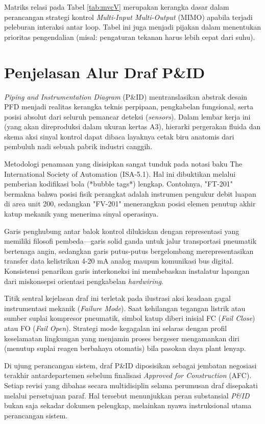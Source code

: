 \documentclass[12pt, a4paper]{report}
\begin{document}
Matriks relasi pada Tabel \ref{tab:mvcV} merupakan kerangka dasar dalam perancangan strategi kontrol \textit{Multi-Input Multi-Output} (MIMO) apabila terjadi peleburan interaksi antar loop. Tabel ini juga menjadi pijakan dalam menentukan prioritas pengendalian (misal: pengaturan tekanan harus lebih cepat dari suhu).

\section{Penjelasan Alur Draf P\&ID}
\textit{Piping and Instrumentation Diagram} (P\&ID) mentranslasikan abstrak desain PFD menjadi realitas kerangka teknis perpipaan, pengkabelan fungsional, serta posisi absolut dari seluruh pemancar deteksi (\textit{sensors}). Dalam lembar kerja ini (yang akan direproduksi dalam ukuran kertas A3), hierarki pergerakan fluida dan skema aksi sinyal kontrol dapat dibaca layaknya cetak biru anatomis dari pembuluh nadi sebuah pabrik industri canggih.

Metodologi penamaan yang disisipkan sangat tunduk pada notasi baku The International Society of Automation (ISA-5.1). Hal ini dibuktikan melalui pemberian kodifikasi bola (*bubble tags*) lengkap. Contohnya, "FT-201" bermakna bahwa posisi fisik perangkat adalah instrumen pengukur debit luapan di area unit 200, sedangkan "FV-201" menerangkan posisi elemen penutup akhir katup mekanik yang menerima sinyal operasinya.

Garis penghubung antar balok kontrol dilukiskan dengan representasi yang memiliki filosofi pembeda—garis solid ganda untuk jalur transportasi pneumatik bertenaga angin, sedangkan garis putus-putus bergelombang merepresentasikan transfer data kelistrikan 4-20 mA analog maupun komunikasi bus digital. Konsistensi penarikan garis interkoneksi ini membebaskan instalatur lapangan dari miskonsepsi orientasi pengkabelan \textit{hardwiring}.

Titik sentral kejelasan draf ini terletak pada ilustrasi aksi keadaan gagal instrumentasi mekanik (\textit{Failure Mode}). Saat kehilangan tegangan listrik atau sumber suplai kompresor pneumatik, simbol katup diberi inisial FC (\textit{Fail Close}) atau FO (\textit{Fail Open}). Strategi mode kegagalan ini selaras dengan profil keselamatan lingkungan yang menjamin proses bergeser mengamankan diri (menutup suplai reagen berbahaya otomatis) bila pasokan daya plant lenyap.

Di ujung perancangan sistem, draf P\&ID diposisikan sebagai jembatan negosiasi terakhir antardepartemen sebelum finalisasi \textit{Approved for Construction} (AFC). Setiap revisi yang dibahas secara multidisiplin selama perumusan draf disepakati melalui persetujuan paraf. Hal tersebut menunjukkan peran substansial \textit{P\&ID} bukan saja sekadar dokumen pelengkap, melainkan nyawa instruksional utama perancangan sistem.
\end{document}
